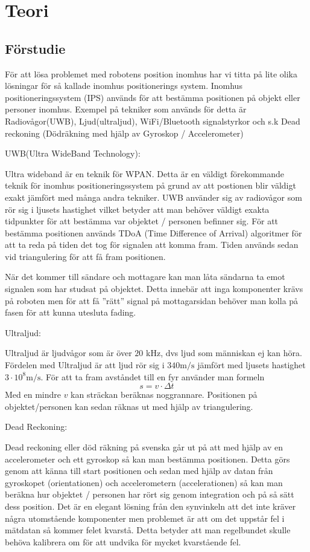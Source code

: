 \documentclass[11pt, a4paper]{report}
\begin{document}
\chapter{Teori}

\section{Förstudie}

För att lösa problemet med robotens position inomhus har vi titta på lite olika lösningar för så kallade inomhus positionerings system. Inomhus positioneringssystem (IPS) används för att bestämma positionen på objekt eller personer inomhus. Exempel på  tekniker som används för detta är Radiovågor(UWB), Ljud(ultraljud), WiFi/Bluetooth signalstyrkor och s.k Dead reckoning (Dödräkning med hjälp av Gyroskop / Accelerometer)


UWB(Ultra WideBand Technology):

Ultra wideband är en teknik för WPAN. Detta är en väldigt förekommande teknik för inomhus positioneringssystem på grund av att postionen blir väldigt exakt jämfört med många andra tekniker. UWB använder sig av radiovågor som rör sig i ljusets hastighet vilket betyder att man behöver väldigt exakta tidpunkter för att bestämma var objektet / personen befinner sig. För att bestämma positionen används TDoA (Time Difference of Arrival) algoritmer för att ta reda på tiden det tog för signalen att komma fram. Tiden används sedan vid triangulering för att få fram positionen.

När det kommer till sändare och mottagare kan man låta sändarna ta emot signalen som har studsat på objektet. Detta innebär att inga komponenter krävs på roboten men för att få ''rätt'' signal på mottagarsidan behöver man kolla på fasen för att kunna utesluta fading.

Ultraljud:

Ultraljud är ljudvågor som är över $20$ \textrm{kHz}, dvs ljud som människan ej kan höra. Fördelen med Ultraljud är att ljud rör sig i $340\textrm{m/s}$ jämfört med ljusets hastighet $3 \cdot 10^{8}\textrm{m/s}$. För att ta fram avståndet till en fyr använder man formeln
\begin{equation}
s = v \cdot \Delta t
\end{equation}
Med en mindre $v$ kan sträckan beräknas noggrannare. Positionen på objektet/personen kan sedan räknas ut med hjälp av triangulering.

Dead Reckoning:

Dead reckoning eller död räkning på svenska går ut på att med hjälp av en accelerometer och ett gyroskop så kan man bestämma positionen. Detta görs genom att känna till start positionen och sedan med hjälp av datan från gyroskopet (orientationen) och accelerometern (accelerationen) så kan man beräkna hur objektet / personen har rört sig genom integration och  på så sätt dess position. Det är en elegant lösning från den synvinkeln att det inte kräver några utomstående komponenter men problemet är att om det uppstår fel i mätdatan så kommer felet kvarstå. Detta betyder att man regelbundet skulle behöva kalibrera om för att undvika för mycket kvarstående fel.
\end{document}
